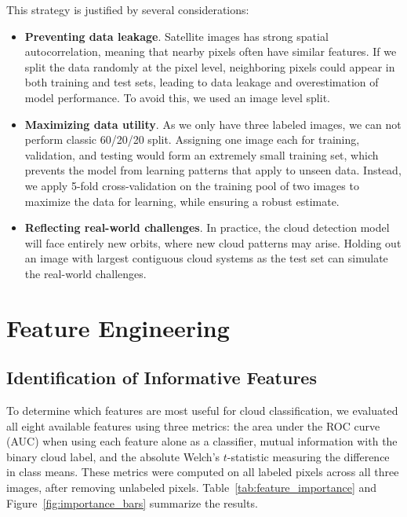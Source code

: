 \documentclass[10pt,letterpaper]{article}
\begin{document}
This strategy is justified by several considerations:
\begin{itemize}
    \item \textbf{Preventing data leakage}. Satellite images has strong spatial autocorrelation, meaning that nearby pixels often have similar features. If we split the data randomly at the pixel level, neighboring pixels could appear in both training and test sets, leading to data leakage and overestimation of model performance. To avoid this, we used an image level split.
    \item \textbf{Maximizing data utility}. As we only have three labeled images, we can not perform classic 60/20/20 split. Assigning one image each for training, validation, and testing would form an extremely small training set, which prevents the model from learning patterns that apply to unseen data. Instead, we apply 5-fold cross-validation on the training pool of two images to maximize the data for learning, while ensuring a robust estimate.

    \item \textbf{Reflecting real-world challenges}. In practice, the cloud detection model will face entirely new orbits, where new cloud patterns may arise. Holding out an image with largest contiguous cloud systems as the test set can simulate the real-world challenges.
\end{itemize}





\section{Feature Engineering}
\subsection{Identification of Informative Features}
To determine which features are most useful for cloud classification, we evaluated all eight available features using three metrics: the area under the ROC curve (AUC) when using each feature alone as a classifier, mutual information with the binary cloud label, and the absolute Welch's $t$-statistic measuring the difference in class means. These metrics were computed on all labeled pixels across all three images, after removing unlabeled pixels. Table~\ref{tab:feature_importance} and Figure~\ref{fig:importance_bars} summarize the results.
 
\end{document}
